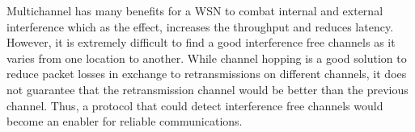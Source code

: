 


Multichannel has many benefits for a WSN to combat internal and external interference which as the effect, increases the throughput and reduces latency.
However, it is extremely difficult to find a good interference free channels as it varies from one location to another. While channel hopping is a good solution to reduce packet losses in exchange to retransmissions on different channels, it does not guarantee that the retransmission channel would be better than the previous channel. Thus, a protocol that could detect interference free channels would become an enabler for reliable communications.


